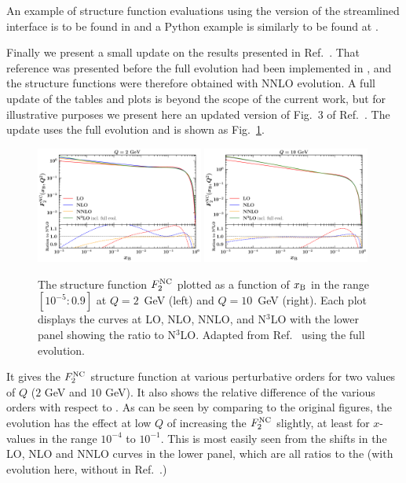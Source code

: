 An example of structure function evaluations using the \CPP{} version
of the streamlined interface is to be found in
and a Python example is similarly to be found at
.

Finally we present a small update on the results presented in
Ref.~\cite{Bertone:2024dpm}. That reference was presented before the
full \ntlo evolution had been implemented in \hoppet, and the \ntlo
structure functions were therefore obtained with NNLO evolution. A
full update of the tables and plots is beyond the scope of the current
work, but for illustrative purposes we present here an updated version
of Fig.~3 of Ref.~\cite{Bertone:2024dpm}.
%
The update uses the full \ntlo evolution and is shown as
Fig.~\ref{fig:perturbativeconvergence}.
%
\begin{figure}[tb!]
  \centering\includegraphics[width=0.49\textwidth]{figs-v2/PerturbativeConvergence_Q_2_GeV.pdf}
  \centering\includegraphics[width=0.49\textwidth]{figs-v2/PerturbativeConvergence_Q_10_GeV.pdf}
  \caption{The structure function $F_2^{\rm NC}$ plotted as a function
    of $x_{\rm B}$ in the range $[10^{-5}:0.9]$ at $Q=2$~GeV (left)
    and $Q=10$~GeV (right). Each plot displays the curves at LO, NLO,
    NNLO, and N$^3$LO with the lower panel showing the ratio to
    N$^3$LO. Adapted from Ref.~\cite{Bertone:2024dpm} using the full
    \ntlo evolution.}
  \label{fig:perturbativeconvergence}
\end{figure}
%
It gives the $F_2^{\rm NC}$ structure function at various
perturbative orders for two values of $Q$ ($2$ GeV and $10$ GeV). It
also shows the relative difference of the various orders with respect
to \ntlo.
%
As can be seen by comparing to the original figures, the
\ntlo evolution has the effect at low $Q$ of increasing the \ntlo $F_2^{\rm NC}$
slightly, at least for $x$-values in the range $10^{-4}$ to $10^{-1}$. 
%
This is most easily seen from the shifts in the LO, NLO and NNLO
curves in the lower panel, which are all ratios to the \ntlo (with
\ntlo evolution here, without in Ref.~\cite{Bertone:2024dpm}.)

